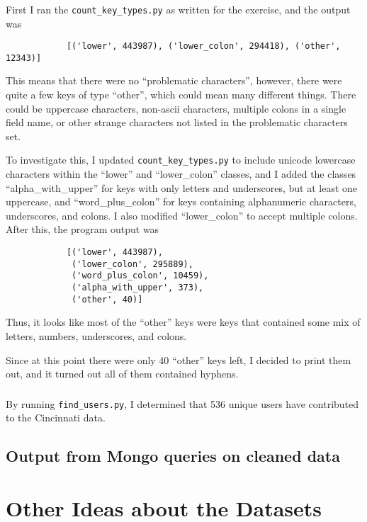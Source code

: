 \documentclass{article}
\begin{document}
            \subsubsection{}
            First I ran the \texttt{count\_key\_types.py} as written for the
            exercise, and the output was
            \begin{lstlisting}
            [('lower', 443987), ('lower_colon', 294418), ('other', 12343)]
            \end{lstlisting}
            This means that there were no ``problematic characters'', however,
            there were quite a few keys of type ``other'', which could mean many
            different things. There could be uppercase characters, non-ascii
            characters, multiple colons in a single field name, or other strange
            characters not listed in the problematic characters set.

            To investigate this, I updated \texttt{count\_key\_types.py} to
            include unicode lowercase characters within the ``lower'' and
            ``lower\_colon'' classes, and I added the classes
            ``alpha\_with\_upper'' for keys with only letters and underscores,
            but at least one uppercase, and ``word\_plus\_colon'' for keys
            containing alphanumeric characters, underscores, and colons. I also
            modified ``lower\_colon'' to accept multiple colons. After this, the
            program output was 
            \begin{lstlisting}
            [('lower', 443987),
             ('lower_colon', 295889),
             ('word_plus_colon', 10459),
             ('alpha_with_upper', 373),
             ('other', 40)]
            \end{lstlisting}
            Thus, it looks like most of the ``other'' keys were keys that
            contained some mix of letters, numbers, underscores, and colons.
            
            Since at this point there were only 40 ``other'' keys left, I
            decided to print them out, and it turned out all of them contained
            hyphens.

            \subsubsection{}
            By running \texttt{find\_users.py}, I determined that 536 unique
            users have contributed to the Cincinnati data.
        \subsection{Output from Mongo queries on cleaned data}
    \section{Other Ideas about the Datasets}
\end{document}
